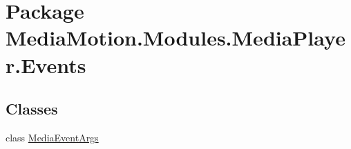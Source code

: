 \hypertarget{namespace_media_motion_1_1_modules_1_1_media_player_1_1_events}{\section{Package Media\+Motion.\+Modules.\+Media\+Player.\+Events}
\label{namespace_media_motion_1_1_modules_1_1_media_player_1_1_events}
}
\subsection*{Classes}
\begin{DoxyCompactItemize}
\item 
class \hyperlink{class_media_motion_1_1_modules_1_1_media_player_1_1_events_1_1_media_event_args}{Media\+Event\+Args}
\end{DoxyCompactItemize}
